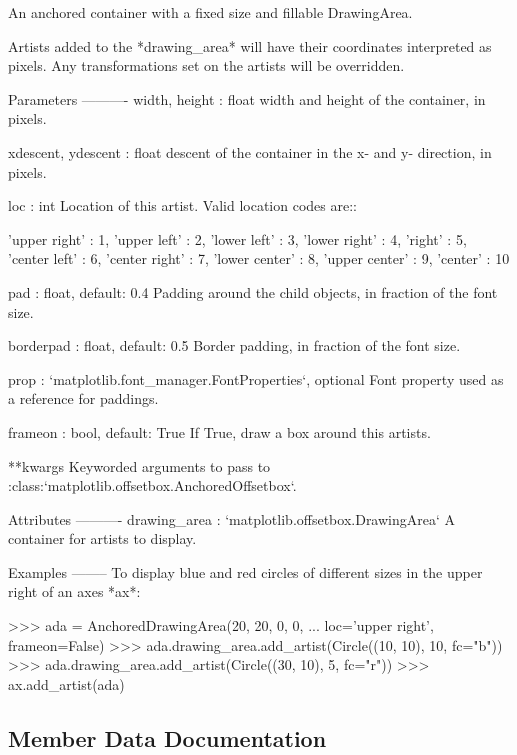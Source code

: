 \begin{DoxyVerb}An anchored container with a fixed size and fillable DrawingArea.

Artists added to the *drawing_area* will have their coordinates
interpreted as pixels. Any transformations set on the artists will be
overridden.

Parameters
----------
width, height : float
    width and height of the container, in pixels.

xdescent, ydescent : float
    descent of the container in the x- and y- direction, in pixels.

loc : int
    Location of this artist. Valid location codes are::

'upper right'  : 1,
'upper left'   : 2,
'lower left'   : 3,
'lower right'  : 4,
'right'        : 5,
'center left'  : 6,
'center right' : 7,
'lower center' : 8,
'upper center' : 9,
'center'       : 10

pad : float, default: 0.4
    Padding around the child objects, in fraction of the font size.

borderpad : float, default: 0.5
    Border padding, in fraction of the font size.

prop : `matplotlib.font_manager.FontProperties`, optional
    Font property used as a reference for paddings.

frameon : bool, default: True
    If True, draw a box around this artists.

**kwargs
    Keyworded arguments to pass to
    :class:`matplotlib.offsetbox.AnchoredOffsetbox`.

Attributes
----------
drawing_area : `matplotlib.offsetbox.DrawingArea`
    A container for artists to display.

Examples
--------
To display blue and red circles of different sizes in the upper right
of an axes *ax*:

>>> ada = AnchoredDrawingArea(20, 20, 0, 0,
...                           loc='upper right', frameon=False)
>>> ada.drawing_area.add_artist(Circle((10, 10), 10, fc="b"))
>>> ada.drawing_area.add_artist(Circle((30, 10), 5, fc="r"))
>>> ax.add_artist(ada)
\end{DoxyVerb}
 

\subsection{Member Data Documentation}
\mbox{\label{classaxes__grid1_1_1anchored__artists_1_1AnchoredDrawingArea_a4785fd434765666d9ee531b9c648907e}} 
